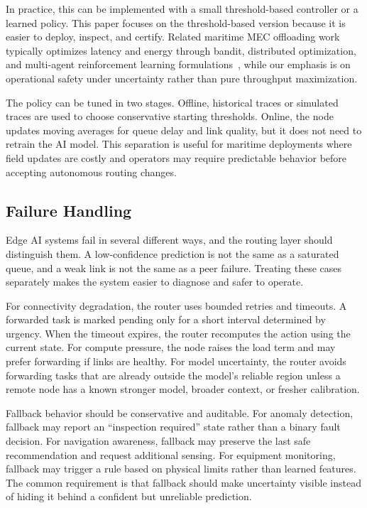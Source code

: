 \documentclass[10pt, conference]{IEEEtran}
\begin{document}
In practice, this can be implemented with a small threshold-based controller or a learned policy. This paper focuses on the threshold-based version because it is easier to deploy, inspect, and certify. Related maritime MEC offloading work typically optimizes latency and energy through bandit, distributed optimization, and multi-agent reinforcement learning formulations~\cite{shi2020edgeai,yang2022mab_maritime,he2025distributed_maritime,ning2025marho}, while our emphasis is on operational safety under uncertainty rather than pure throughput maximization.

The policy can be tuned in two stages. Offline, historical traces or simulated traces are used to choose conservative starting thresholds. Online, the node updates moving averages for queue delay and link quality, but it does not need to retrain the AI model. This separation is useful for maritime deployments where field updates are costly and operators may require predictable behavior before accepting autonomous routing changes.

\subsection{Failure Handling}
Edge AI systems fail in several different ways, and the routing layer should distinguish them. A low-confidence prediction is not the same as a saturated queue, and a weak link is not the same as a peer failure. Treating these cases separately makes the system easier to diagnose and safer to operate.

For connectivity degradation, the router uses bounded retries and timeouts. A forwarded task is marked pending only for a short interval determined by urgency. When the timeout expires, the router recomputes the action using the current state. For compute pressure, the node raises the load term and may prefer forwarding if links are healthy. For model uncertainty, the router avoids forwarding tasks that are already outside the model's reliable region unless a remote node has a known stronger model, broader context, or fresher calibration.

Fallback behavior should be conservative and auditable. For anomaly detection, fallback may report an ``inspection required'' state rather than a binary fault decision. For navigation awareness, fallback may preserve the last safe recommendation and request additional sensing. For equipment monitoring, fallback may trigger a rule based on physical limits rather than learned features. The common requirement is that fallback should make uncertainty visible instead of hiding it behind a confident but unreliable prediction.
\end{document}
